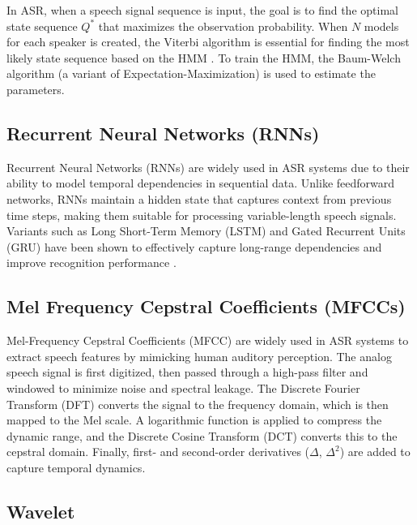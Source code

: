 \documentclass[conference]{IEEEtran}
\begin{document}
In ASR, when a speech signal sequence is input, the goal is to find the optimal state sequence $Q^*$ that maximizes
the observation probability. When \(N\) models for each speaker is created, the Viterbi algorithm is
essential for finding the most likely state sequence based on the HMM \cite{ilyas2007speaker}.
To train the HMM, the Baum-Welch algorithm (a variant of Expectation-Maximization) is used to estimate the parameters.






\subsection{Recurrent Neural Networks (RNNs)}

Recurrent Neural Networks (RNNs) are widely used in ASR systems due to their ability to model temporal dependencies in sequential data. Unlike feedforward networks, RNNs maintain a hidden state that captures context from previous time steps, making them suitable for processing variable-length speech signals. Variants such as Long Short-Term Memory (LSTM) and Gated Recurrent Units (GRU) have been shown to effectively capture long-range dependencies and improve recognition performance \cite{graves2013speech}.

\subsection{Mel Frequency Cepstral Coefficients (MFCCs)}
Mel-Frequency Cepstral Coefficients (MFCC) are widely used in ASR systems to extract speech features by
mimicking human auditory perception. The analog speech signal is first digitized, then passed through a
high-pass filter and windowed to minimize noise and spectral leakage. The Discrete Fourier Transform (DFT)
converts the signal to the frequency domain, which is then mapped to the Mel scale. A logarithmic function
is applied to compress the dynamic range, and the Discrete Cosine Transform (DCT) converts this to the cepstral
domain. Finally, first- and second-order derivatives ($\Delta$, $\Delta^2$) are added to capture temporal dynamics. \cite{davis1980comparison}















\subsection{Wavelet}
\end{document}
